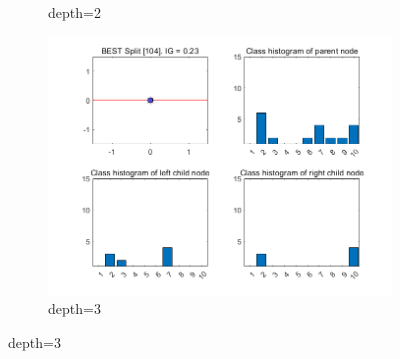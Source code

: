 \begin{figure}[htbp]
\begin{subfigure}{0.33\linewidth}
		\caption{depth=2}
	\end{subfigure}
	\hfill
	\begin{subfigure}{0.33\linewidth}
		\centering
		\includegraphics[width=\linewidth]{image/q2-infgain/fig3.png}
		\caption{depth=3}
	\end{subfigure}
	

\end{figure}
